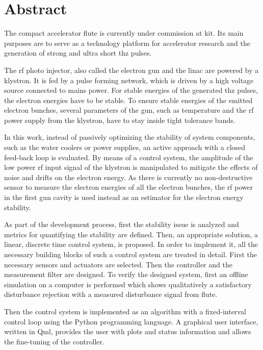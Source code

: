 \chapter*{Abstract}
The compact accelerator \gls{flute} is currently under commission at \gls{kit}. Its main purposes are to serve as a technology platform for accelerator research and the generation of strong and ultra short \gls{thz} pulses.

The \gls{rf} photo injector, also called the electron gun and the \gls{linac} are powered by a klystron. It is fed by a pulse forming network, which is driven by a high voltage source connected to mains power. For stable energies of the generated \gls{thz} pulses, the electron energies have to be stable. To ensure stable energies of the emitted electron bunches, several parameters of the gun, such as temperature and the \gls{rf} power supply from the klystron, have to stay inside tight tolerance bands.

In this work, instead of passively optimizing the stability of system components, such as the water coolers or power supplies, an active approach with a closed feed-back loop is evaluated. By means of a control system, the amplitude of the low power \gls{rf} input signal of the klystron is manipulated to mitigate the effects of noise and drifts on the electron energy. As there is currently no non-destructive sensor to measure the electron energies of all the electron bunches, the \gls{rf} power in the first gun cavity is used instead as an estimator for the electron energy stability.

As part of the development process, first the stability issue is analyzed and metrics for quantifying the stability are defined. Then, an appropriate solution, a linear, discrete time control system, is proposed. In order to implement it, all the necessary building blocks of such a control system are treated in detail. First the necessary sensors and actuators are selected. Then the controller and the measurement filter are designed. To verify the designed system, first an offline simulation on a computer is performed which shows qualitatively a satisfactory disturbance rejection with a measured disturbance signal from \gls{flute}. 

Then the control system is implemented as an algorithm with a fixed-interval control loop using the Python programming language. A graphical user interface, written in Qml, provides the user with plots and status information and allows the fine-tuning of the controller.

